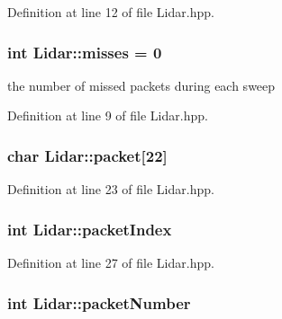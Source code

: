 Definition at line 12 of file Lidar.\-hpp.

\hypertarget{classLidar_a8eea2300d585c1b514ac6211a7326aca}{
\subsubsection[{misses}]{\setlength{\rightskip}{0pt plus 5cm}int Lidar\-::misses = 0}}\label{classLidar_a8eea2300d585c1b514ac6211a7326aca}
the number of missed packets during each sweep 

Definition at line 9 of file Lidar.\-hpp.

\hypertarget{classLidar_a59f93afd1061d31642d1e7755838f2d1}{
\subsubsection[{packet}]{\setlength{\rightskip}{0pt plus 5cm}char Lidar\-::packet\mbox{[}22\mbox{]}\hspace{0.3cm}{\ttfamily [private]}}}\label{classLidar_a59f93afd1061d31642d1e7755838f2d1}


Definition at line 23 of file Lidar.\-hpp.

\hypertarget{classLidar_a5e06436eae4b2d150501df175ec04758}{
\subsubsection[{packet\-Index}]{\setlength{\rightskip}{0pt plus 5cm}int Lidar\-::packet\-Index\hspace{0.3cm}{\ttfamily [private]}}}\label{classLidar_a5e06436eae4b2d150501df175ec04758}


Definition at line 27 of file Lidar.\-hpp.

\hypertarget{classLidar_abcca8f7f6c4cff325e6b225ddbe14796}{
\subsubsection[{packet\-Number}]{\setlength{\rightskip}{0pt plus 5cm}int Lidar\-::packet\-Number\hspace{0.3cm}{\ttfamily [private]}}}\label{classLidar_abcca8f7f6c4cff325e6b225ddbe14796}


